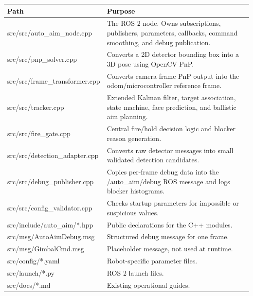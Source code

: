 \documentclass[11pt,oneside]{report}
\DeclareRobustCommand{\topic}[1]{\texttt{\detokenize{#1}}}
\DeclareRobustCommand{\file}[1]{\texttt{\detokenize{#1}}}
\def\topic#1{#1}%
\def\file#1{#1}%
\begin{document}
\begin{longtable}{p{}p{}}
\toprule
Path & Purpose \\
\midrule
\file{src/src/auto_aim_node.cpp} & The ROS 2 node. Owns subscriptions,
publishers, parameters, callbacks, command smoothing, and debug publication. \\
\file{src/src/pnp_solver.cpp} & Converts a 2D detector bounding box into a 3D
pose using OpenCV PnP. \\
\file{src/src/frame_transformer.cpp} & Converts camera-frame PnP output into
the odom/microcontroller reference frame. \\
\file{src/src/tracker.cpp} & Extended Kalman filter, target association,
state machine, face prediction, and ballistic aim planning. \\
\file{src/src/fire_gate.cpp} & Central fire/hold decision logic and blocker
reason generation. \\
\file{src/src/detection_adapter.cpp} & Converts raw detector messages into
small validated detection candidates. \\
\file{src/src/debug_publisher.cpp} & Copies per-frame debug data into the
\topic{/auto_aim/debug} ROS message and logs blocker histograms. \\
\file{src/src/config_validator.cpp} & Checks startup parameters for impossible
or suspicious values. \\
\file{src/include/auto_aim/*.hpp} & Public declarations for the C++ modules. \\
\file{src/msg/AutoAimDebug.msg} & Structured debug message for one frame. \\
\file{src/msg/GimbalCmd.msg} & Placeholder message, not used at runtime. \\
\file{src/config/*.yaml} & Robot-specific parameter files. \\
\file{src/launch/*.py} & ROS 2 launch files. \\
\file{src/docs/*.md} & Existing operational guides. \\
\bottomrule
\end{longtable}




\end{document}

